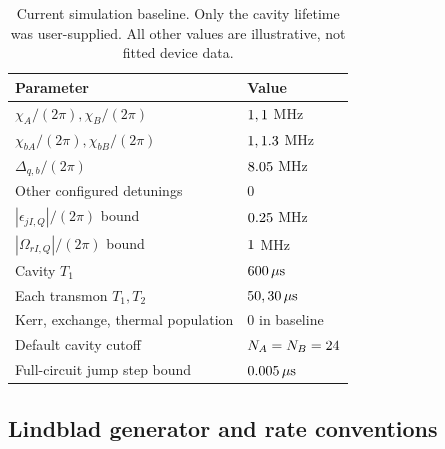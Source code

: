 \documentclass[aps,prb,reprint,amsmath,amssymb,nofootinbib]{revtex4-2}
\begin{document}
\begin{table}[t]
\caption{Current simulation baseline. Only the cavity lifetime was
user-supplied. All other values are illustrative, not fitted device data.}
\label{tab:parameters}
\begin{ruledtabular}
\begin{tabular}{ll}
Parameter & Value\\ \hline
$\chi_A/(2\pi),\chi_B/(2\pi)$ & $1,1$ MHz\\
$\chi_{bA}/(2\pi),\chi_{bB}/(2\pi)$ & $1,1.3$ MHz\\
$\Delta_{q,b}/(2\pi)$ & $8.05$ MHz\\
Other configured detunings & $0$\\
$|\epsilon_{jI,Q}|/(2\pi)$ bound & $0.25$ MHz\\
$|\Omega_{rI,Q}|/(2\pi)$ bound & $1$ MHz\\
Cavity $T_1$ & $600\,\mu\mathrm{s}$\\
Each transmon $T_1,T_2$ & $50,30\,\mu\mathrm{s}$\\
Kerr, exchange, thermal population & $0$ in baseline\\
Default cavity cutoff & $N_A=N_B=24$\\
Full-circuit jump step bound & $0.005\,\mu\mathrm{s}$\\
\end{tabular}
\end{ruledtabular}
\end{table}

\subsection{Lindblad generator and rate conventions}
\end{document}
